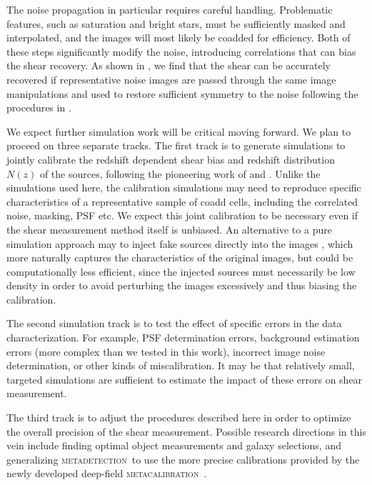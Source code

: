 \documentclass[twocolumn,twocolappendix,astrosym]{openjournal}
\newcommand{\mcal}{\textsc{metacalibration}}
\newcommand{\mdet}{\textsc{metadetection}}
\begin{document}
The noise propagation in particular requires careful handling.  Problematic
features, such as saturation and bright stars, must be sufficiently masked and
interpolated, and the images will most likely be coadded for efficiency. Both
of these steps significantly modify the noise, introducing correlations that
can bias the shear recovery.  As shown in \citep{BeckerMdetCoadd}, we find that
the shear can be accurately recovered if representative noise images are passed
through the same image manipulations and used to restore sufficient symmetry to
the noise following the procedures in \cite{SheldonMcal2017}.

We expect further simulation work will be critical moving forward.  We plan to
proceed on three separate tracks.  The first track is to generate simulations to
jointly calibrate the redshift dependent shear bias and redshift distribution
$N(z)$ of the sources, following the pioneering work of \cite{MacCrann2022} and
\cite{LiNofz2022}.  Unlike the simulations used here, the calibration
simulations may need to reproduce specific characteristics of a representative
sample of coadd cells, including the correlated noise, masking, PSF etc.  We
expect this joint calibration to be necessary even if the shear measurement
method itself is unbiased.  An alternative to a pure simulation approach may to
inject fake sources directly into the images
\citep{SuchytaBalrog2016,EverettBalrog2022}, which more naturally captures the
characteristics of the original images, but could be computationally
less efficient, since the injected sources must necessarily be low density 
in order to avoid perturbing the images excessively and thus biasing the
calibration.

The second simulation track is to test the effect of specific errors in the
data characterization.  For example, PSF determination errors, background
estimation errors (more complex than we tested in this work), incorrect image
noise determination, or other kinds of miscalibration.  It may be that
relatively small, targeted simulations are sufficient to estimate the impact of
these errors on shear measurement.

The third track is to adjust the procedures described here in order to optimize
the overall precision of the shear measurement. Possible research directions in
this vein include finding optimal object measurements and galaxy selections,
and generalizing \mdet\ to use the more precise calibrations
provided by the newly developed deep-field \mcal\ \citep{dfmcal22}.
\end{document}
